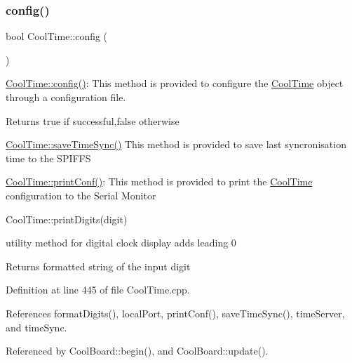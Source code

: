 \subsubsection{\texorpdfstring{config()}{config()}\hspace{0.1cm}{\footnotesize\ttfamily [1/2]}}
{\footnotesize\ttfamily bool Cool\+Time\+::config (\begin{DoxyParamCaption}{ }\end{DoxyParamCaption})}

\hyperlink{classCoolTime_a87c28260c1bc77091162cbcf1ee2e129}{Cool\+Time\+::config()}\+: This method is provided to configure the \hyperlink{classCoolTime}{Cool\+Time} object through a configuration file.

\begin{DoxyReturn}{Returns}
true if successful,false otherwise 
\end{DoxyReturn}
\hyperlink{classCoolTime_ae9658c9b377510d469e3b88edf33ee85}{Cool\+Time\+::save\+Time\+Sync()} This method is provided to save last syncronisation time to the S\+P\+I\+F\+FS

\hyperlink{classCoolTime_af355e7f9b3898211cd2ff25eab5933b1}{Cool\+Time\+::print\+Conf()}\+: This method is provided to print the \hyperlink{classCoolTime}{Cool\+Time} configuration to the Serial Monitor

Cool\+Time\+::print\+Digits(digit)

utility method for digital clock display adds leading 0

\begin{DoxyReturn}{Returns}
formatted string of the input digit
\end{DoxyReturn}


Definition at line 445 of file Cool\+Time.\+cpp.



References format\+Digits(), local\+Port, print\+Conf(), save\+Time\+Sync(), time\+Server, and time\+Sync.



Referenced by Cool\+Board\+::begin(), and Cool\+Board\+::update().


